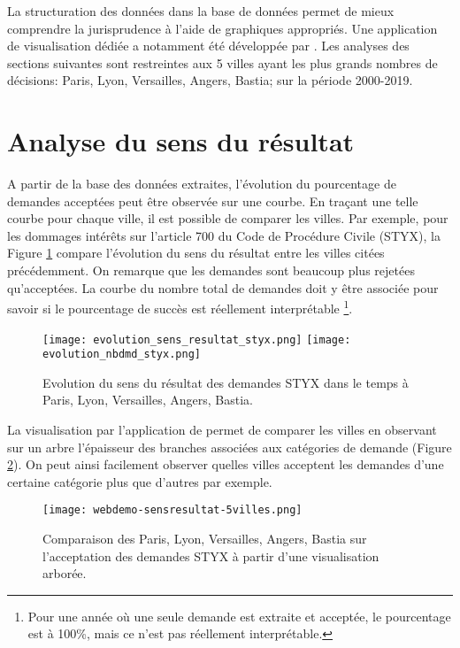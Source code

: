 La structuration des données dans la base de données permet de mieux comprendre la jurisprudence à l'aide de graphiques appropriés. Une application de visualisation dédiée a notamment été développée  par \citet{PRYSIAZHNIUK2017jurisprudence-demo-web}.
Les analyses des sections suivantes sont restreintes aux 5 villes ayant les plus grands nombres de décisions: Paris, Lyon, Versailles, Angers, Bastia; sur la période 2000-2019.

\section{Analyse du sens du résultat}
A partir de la base des données extraites, l'évolution du pourcentage de demandes acceptées  peut être observée sur une courbe. En traçant une telle courbe pour chaque ville, il est possible de comparer les villes.
Par exemple, pour les dommages intérêts sur l'article 700 du Code de Procédure Civile (STYX), la Figure \ref{fig:demo:analyse-sens-resultat-styx} compare l'évolution du sens du résultat entre les villes citées précédemment. On remarque que les demandes sont beaucoup plus rejetées qu'acceptées. La courbe du nombre total de demandes doit y être associée pour savoir si le pourcentage de succès est réellement interprétable \footnote{Pour une année où une seule demande est extraite et acceptée, le pourcentage est à 100\%, mais ce n'est pas réellement interprétable.}.

\begin{figure}[!htb]
	\centering 
	\texttt{[image: evolution\_sens\_resultat\_styx.png]}
	\texttt{[image: evolution\_nbdmd\_styx.png]}
	\caption{Evolution du sens du résultat des demandes STYX dans le temps à Paris, Lyon, Versailles, Angers, Bastia.}\label{fig:demo:analyse-sens-resultat-styx}
\end{figure}

La visualisation par l'application de \citet{PRYSIAZHNIUK2017jurisprudence-demo-web} permet de comparer les villes en observant sur un arbre l'épaisseur des branches associées aux catégories de demande (Figure \ref{fig:demo:web-styx}). On peut ainsi facilement observer quelles villes acceptent les demandes d'une certaine catégorie plus que d'autres par exemple.


\begin{figure}[!htb]
	\centering 
	\texttt{[image: webdemo-sensresultat-5villes.png]}
	\caption{Comparaison des Paris, Lyon, Versailles, Angers, Bastia sur l'acceptation des demandes STYX à partir d'une visualisation arborée.}\label{fig:demo:web-styx}
\end{figure}

